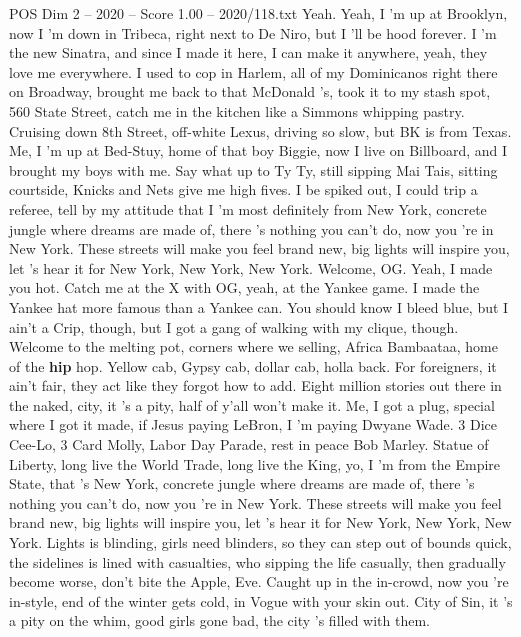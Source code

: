 \begin{textsample}{POS Dim 2 – 2020 – Score 1.00 – 2020/118.txt}  \label{ex:f2_pos_029}
Yeah.
Yeah, I 'm up at Brooklyn, now I 'm down in Tribeca, right next to De Niro, but I 'll be hood forever.
I 'm the new Sinatra, and since I made it here, I can make it anywhere, yeah, they love me everywhere.
I used to cop in Harlem, all of my Dominicanos right there on Broadway, brought me back to that McDonald 's, took it to my stash spot, 560 State Street, catch me in the kitchen like a Simmons whipping pastry.
Cruising down 8th Street, off-white Lexus, driving so slow, but BK is from Texas.
Me, I 'm up at Bed-Stuy, home of that boy Biggie, now I live on Billboard, and I brought my boys with me.
Say what up to Ty Ty, still sipping Mai Tais, sitting courtside, Knicks and Nets give me high fives.
I be spiked out, I could trip a referee, tell by my attitude that I 'm most definitely from New York, concrete jungle where dreams are made of, there 's nothing you can't do, now you 're in New York.
These streets will make you feel brand new, big lights will inspire you, let 's hear it for New York, New York, New York.
Welcome, OG.
Yeah, I made you hot.
Catch me at the X with OG, yeah, at the Yankee game.
I made the Yankee hat more famous than a Yankee can.
You should know I bleed blue, but I ain't a Crip, though, but I got a gang of walking with my clique, though.
Welcome to the melting pot, corners where we selling, Africa Bambaataa, home of the \textbf{hip} hop.
Yellow cab, Gypsy cab, dollar cab, holla back.
For foreigners, it ain't fair, they act like they forgot how to add.
Eight million stories out there in the naked, city, it 's a pity, half of y'all won't make it.
Me, I got a plug, special where I got it made, if Jesus paying LeBron, I 'm paying Dwyane Wade. 3 Dice Cee-Lo, 3 Card Molly, Labor Day Parade, rest in peace Bob Marley.
Statue of Liberty, long live the World Trade, long live the King, yo, I 'm from the Empire State, that 's New York, concrete jungle where dreams are made of, there 's nothing you can't do, now you 're in New York.
These streets will make you feel brand new, big lights will inspire you, let 's hear it for New York, New York, New York.
Lights is blinding, girls need blinders, so they can step out of bounds quick, the sidelines is lined with casualties, who sipping the life casually, then gradually become worse, don't bite the Apple, Eve.
Caught up in the in-crowd, now you 're in-style, end of the winter gets cold, in Vogue with your skin out.
City of Sin, it 's a pity on the whim, good girls gone bad, the city 's filled with them.

\end{textsample}
